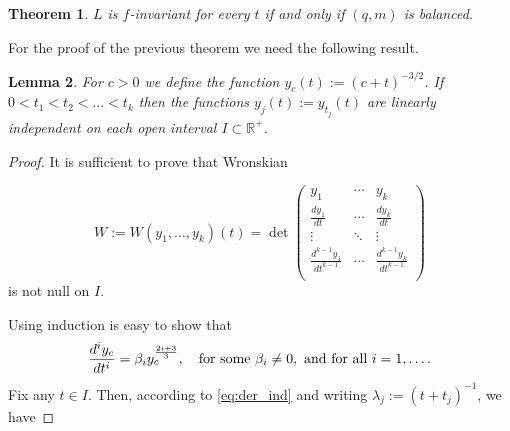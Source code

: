 \documentclass[twoside]{article}
\newtheorem{thm}{Theorem}[section]
\newtheorem{lem}[thm]{Lemma}
\theoremstyle{remark}
\begin{document}
\begin{thm}\label{thm:prim} $L$ is $f$-invariant for every $t$ if and only if $(q,m)$ is balanced.
\end{thm}

For the proof of the previous theorem we need the following result.


\begin{lem}\label{lem:1} For $c>0$ we define the function $y_c(t):=(c+t)^{-3/2}$. If $0<t_1<t_2<\ldots<t_k$ then the functions $y_j(t):=y_{t_j}(t)$  are linearly independent on  each open interval   $I\subset \mathbb{R}^+$.
\end{lem}
\begin{proof} It is sufficient to prove that Wronskian

 \[W:=W(y_1,\ldots,y_k)(t)=\det\begin{pmatrix}
			      y_1 & \cdots & y_k\\
			      \frac{dy_1}{dt}&  \cdots & \frac{dy_k}{dt}\\
			      \vdots & \ddots & \vdots \\
			      \frac{d^{k-1}y_1}{dt^{k-1}}&  \cdots & \frac{d^{k-1}y_k}{dt^{k-1}}\\
                           \end{pmatrix}
\]
is not null on $I$.

Using induction is easy to show that
\begin{equation}\label{eq:der_ind}\frac{d^iy_c}{dt^i}=\beta_{i}y_{c}^{\frac{2i+3}{3}},\quad\hbox{for some }\beta_{i}\neq 0, \hbox{ and for all }i=1,\ldots.
\end{equation}
Fix any $t\in I$. Then, according to \eqref{eq:der_ind} and writing $\lambda_j:=(t+t_j)^{-1}$, we have


\end{proof}
\end{document}
